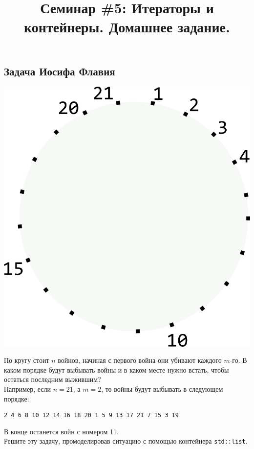 \documentclass{article}
\begin{document}
\title{Семинар \#5: Итераторы и контейнеры. Домашнее задание.\vspace{-5ex}}\date{}\maketitle

\subsection{Задача Иосифа Флавия}

\begin{multicols}{2}
\includegraphics[scale=1]{../images/josephus.png}

\noindent По кругу стоит $n$ войнов, начиная с первого война они убивают каждого $m$-го. В каком порядке будут выбывать войны и в каком месте нужно встать, чтобы остаться последним выжившим?\\

\noindent Например, если $n = 21$, а $m = 2$, то войны будут выбывать в следующем порядке:
\begin{verbatim}
2 4 6 8 10 12 14 16 18 20 1 5 9 13 17 21 7 15 3 19
\end{verbatim}
В конце останется войн с номером 11.\\

\noindent Решите эту задачу, промоделировав ситуацию с помощью контейнера \texttt{std::list}.
\end{multicols}
\end{document}
